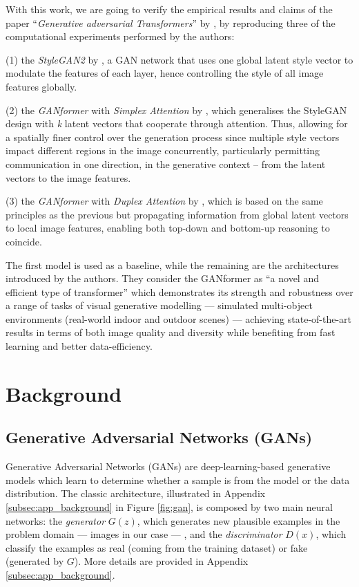 \documentclass{article}
\begin{document}
	With this work, we are going to verify the empirical results and claims of the paper 
	``\emph{Generative adversarial Transformers}'' by \citet{hudson2021generative}, by reproducing 
	three of the computational experiments performed by the authors:
	\begin{enumerate*}
		\item[(1)] the \textit{StyleGAN2} by \citet{karras2020analyzing,karras2019style}, a GAN 
		network that uses one global latent style vector to modulate the features of each layer, hence 
		controlling the style of all image features globally.
		\item[(2)] the \textit{GANformer} with \textit{Simplex Attention} by 
		\citet{hudson2021generative}, which generalises the StyleGAN design with \textit{k} latent 
		vectors that cooperate through attention. Thus, allowing for a spatially finer control over the 
		generation 
		process since multiple style vectors impact different regions in the image concurrently, 
		particularly 
		permitting communication in one direction, in the generative context – from the latent vectors to 
		the 
		image features.
		\item[(3)] the \textit{GANformer} with \textit{Duplex Attention} by \citet{hudson2021generative}, 
		which is based on the same principles as the previous but propagating information from 
		global latent vectors to local image features, enabling both top-down and bottom-up reasoning to 
		coincide.
	\end{enumerate*} 
	
	The first model is used as a baseline, while the remaining are the architectures introduced by the 
	authors. 
	They consider the GANformer as “a novel and efficient type of transformer” which demonstrates its 
	strength 
	and robustness over a range of tasks of visual generative modelling — simulated multi-object 
	environments 
	(real-world indoor and outdoor scenes) — achieving state-of-the-art results in terms of both image 
	quality 
	and diversity while benefiting from fast learning and better data-efficiency.
	
	\section{Background}\label{sec:background}
	\subsection{Generative Adversarial Networks (GANs)}\label{sec:gan}
	Generative Adversarial Networks (GANs) \cite{goodfellow2014generative} are deep-learning-based 
	generative models which learn to determine whether a sample is from the model or the data 
	distribution. 
	The classic architecture, illustrated in Appendix \ref{subsec:app_background} in Figure 
	\ref{fig:gan}, is 
	composed by two main neural networks: 
	the \textit{generator} ${G(z)}$, which generates new plausible examples in the problem domain — 
	images in our case — , and the \textit{discriminator} ${D(x)}$, which classify the examples as 
	real (coming from the training dataset) or fake (generated by $G$). More details are provided in 
	Appendix \ref{subsec:app_background}.
	
\end{document}

